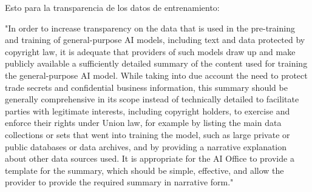 Esto para la transparencia de los datos de entrenamiento:

"In order to increase transparency on the data that is used in the pre-training and training of general-purpose AI models, including text and data protected by copyright law, it is adequate that providers of such models draw up and make publicly available a sufficiently detailed summary of the content used for training the general-purpose AI model. While taking into due account the need to protect trade secrets and confidential business information, this summary should be generally comprehensive in its scope instead of technically detailed to facilitate parties with legitimate interests, including copyright holders, to exercise and enforce their rights under Union law, for example by listing the main data collections or sets that went into training the model, such as large private or public databases or data archives, and by providing a narrative explanation about other data sources used. It is appropriate for the AI Office to provide a template for the summary, which should be simple, effective, and allow the provider to provide the required summary in narrative form."